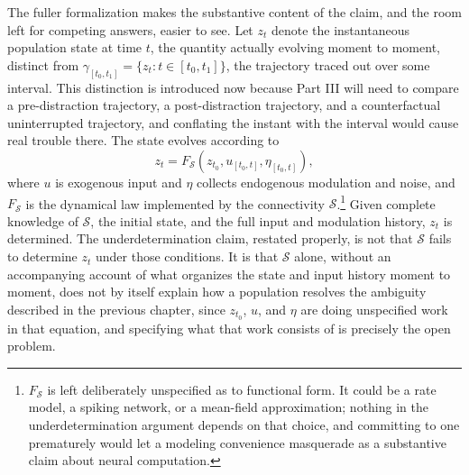\documentclass[11pt]{book}
\begin{document}
The fuller formalization makes the substantive content of the claim, and the room left for competing answers, easier to see. Let $z_t$ denote the instantaneous population state at time $t$, the quantity actually evolving moment to moment, distinct from $\gamma_{[t_0,t_1]} = \{z_t : t \in [t_0,t_1]\}$, the trajectory traced out over some interval. This distinction is introduced now because Part III will need to compare a pre-distraction trajectory, a post-distraction trajectory, and a counterfactual uninterrupted trajectory, and conflating the instant with the interval would cause real trouble there. The state evolves according to
\[
z_t = F_{\mathcal S}\!\left(z_{t_0}, u_{[t_0,t]}, \eta_{[t_0,t]}\right),
\]
where $u$ is exogenous input and $\eta$ collects endogenous modulation and noise, and $F_{\mathcal S}$ is the dynamical law implemented by the connectivity $\mathcal S$.\footnote{$F_{\mathcal S}$ is left deliberately unspecified as to functional form. It could be a rate model, a spiking network, or a mean-field approximation; nothing in the underdetermination argument depends on that choice, and committing to one prematurely would let a modeling convenience masquerade as a substantive claim about neural computation.} Given complete knowledge of $\mathcal S$, the initial state, and the full input and modulation history, $z_t$ is determined. The underdetermination claim, restated properly, is not that $\mathcal S$ fails to determine $z_t$ under those conditions. It is that $\mathcal S$ alone, without an accompanying account of what organizes the state and input history moment to moment, does not by itself explain how a population resolves the ambiguity described in the previous chapter, since $z_{t_0}$, $u$, and $\eta$ are doing unspecified work in that equation, and specifying what that work consists of is precisely the open problem.
\end{document}
